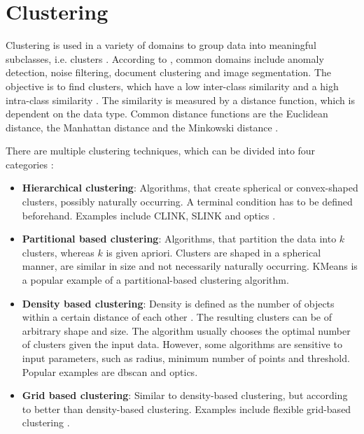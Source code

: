 
\section{Clustering}\label{sec:clustering}

Clustering is used in a variety of domains to group data into meaningful subclasses, i.e. clusters \cite{OPTICS2013, OPTICS2014, OPTICS_kMeans_2016}.
According to \citeauthor{OPTICS2013}, common domains include anomaly detection, noise filtering, document clustering and image segmentation. 
The objective is to find clusters, which have a low inter-class similarity and a high intra-class similarity \cite{OPTICS2013}.
The similarity is measured by a distance function, which is dependent on the data type. 
Common distance functions are the Euclidean distance, the Manhattan distance and the Minkowski distance \cite{OPTICS_kMeans_2016}.

There are multiple clustering techniques, which can be divided into four categories \cite{OPTICS2016}: 
\begin{itemize}
    \item \textbf{Hierarchical clustering}:
    Algorithms, that create spherical or convex-shaped clusters, possibly naturally occurring. 
    A terminal condition has to be defined beforehand.
    Examples include CLINK, SLINK \cite{OPTICS2014} and \ac{optics} \cite{OPTICS2013}.

    \item \textbf{Partitional based clustering}: 
    Algorithms, that partition the data into $k$ clusters, whereas $k$ is given apriori.
    Clusters are shaped in a spherical manner, are similar in size and not necessarily naturally occurring.
    KMeans is a popular example of a partitional-based clustering algorithm.

    \item \textbf{Density based clustering}:
    Density is defined as the number of objects within a certain distance of each other \cite{OPTICS_kMeans_2016}.
    The resulting clusters can be of arbitrary shape and size.
    The algorithm usually chooses the optimal number of clusters given the input data.
    However, some algorithms are sensitive to input parameters, such as radius, minimum number of points and threshold.
    Popular examples are \ac{dbscan} and \ac{optics}.
    
    \item \textbf{Grid based clustering}:
    Similar to density-based clustering, but according to \citeauthor{OPTICS2016} better than density-based clustering.
    Examples include flexible grid-based clustering \cite{OPTICS2014}.
    
\end{itemize}

